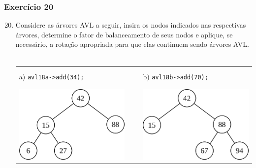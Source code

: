 \documentclass[aspectratio=169]{beamer}
\begin{document}
\begin{frame}[fragile]\frametitle{Exercício 20}
\begin{enumerate}
	\setcounter{enumi}{19}
	\item Considere as árvores AVL a seguir, insira os nodos indicados nas respectivas árvores, determine o fator de balanceamento de seus nodos e aplique, se necessário, a rotação apropriada para que elas continuem sendo árvores AVL.\\~\\
\begin{tabular}{lll}
a) \texttt{avl18a->add(34);}& ~ ~ & b) \texttt{avl18b->add(70);}\\
\includegraphics[height=0.3\paperheight]{imagens/avl19.png} & ~ ~ &
\includegraphics[height=0.3\paperheight]{imagens/avl20.png} \\
\end{tabular}
\end{enumerate}
\end{frame}
\end{document}
